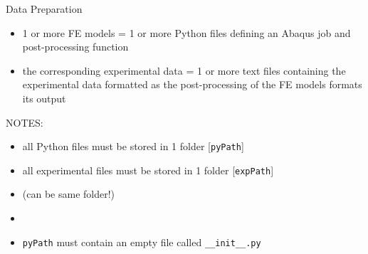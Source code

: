 \begin{frame}[fragile]{Data Preparation}
\begin{itemize}
\item 1 or more FE models = 1 or more Python files defining an Abaqus job and post-processing function
\item the corresponding experimental data = 1 or more text files containing the experimental data formatted as the post-processing of the FE models formats its output
\end{itemize}

NOTES:
\begin{itemize}
\item[] all Python files must be stored in 1 folder [\texttt{pyPath}]
\item[] all experimental files must be stored in 1 folder [\texttt{expPath}]
\item[] (can be same folder!)
\item[]
\item[] \texttt{pyPath} must contain an empty file called \texttt{\_\_init\_\_.py}
\end{itemize}
\end{frame}